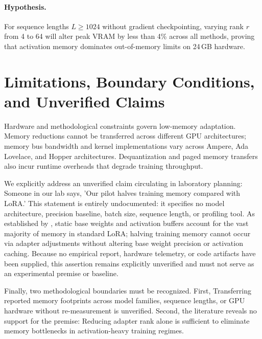 \documentclass[11pt,a4paper]{article}
\begin{document}
\paragraph{Hypothesis.}
For sequence lengths $L \ge 1024$ without gradient checkpointing, varying rank $r$ from 4 to 64 will alter peak VRAM by less than 4\% across all methods, proving that activation memory dominates out-of-memory limits on 24\,GB hardware.

\section{Limitations, Boundary Conditions, and Unverified Claims}

Hardware and methodological constraints govern low-memory adaptation. Memory reductions cannot be transferred across different GPU architectures; memory bus bandwidth and kernel implementations vary across Ampere, Ada Lovelace, and Hopper architectures. Dequantization and paged memory transfers also incur runtime overheads that degrade training throughput.

We explicitly address an unverified claim circulating in laboratory planning: Someone in our lab says, 'Our pilot halves training memory compared with LoRA.' This statement is entirely undocumented: it specifies no model architecture, precision baseline, batch size, sequence length, or profiling tool. As established by \citet{dettmers2023qlora}, static base weights and activation buffers account for the vast majority of memory in standard LoRA; halving training memory cannot occur via adapter adjustments without altering base weight precision or activation caching. Because no empirical report, hardware telemetry, or code artifacts have been supplied, this assertion remains explicitly unverified and must not serve as an experimental premise or baseline.

Finally, two methodological boundaries must be recognized. First, Transferring reported memory footprints across model families, sequence lengths, or GPU hardware without re-measurement is unverified. Second, the literature reveals no support for the premise: Reducing adapter rank alone is sufficient to eliminate memory bottlenecks in activation-heavy training regimes.



\end{document}
